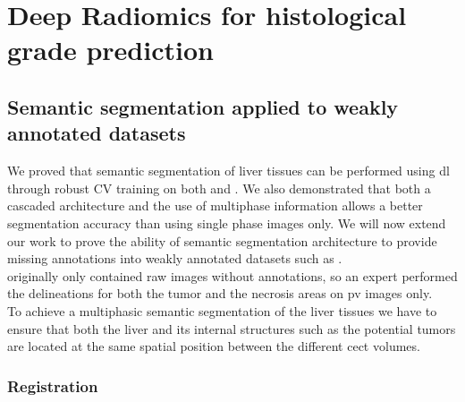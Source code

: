 \chapter{Deep Radiomics for histological grade prediction}

\section{Semantic segmentation applied to weakly annotated datasets}

We proved that semantic segmentation of liver tissues can be
performed using \ac{dl} through robust CV training on both \textbf{} and
\textbf{}.
We also demonstrated that both a cascaded architecture and the use of
multiphase information allows a better segmentation accuracy than using
single phase images only.
We will now extend our work to prove the ability of semantic segmentation architecture to provide missing annotations into weakly annotated datasets such as \textbf{}.\\
\textbf{} originally only
contained raw images without annotations, so an expert performed the
delineations for both the tumor and the necrosis areas on \ac{pv} images only. \\
To achieve a multiphasic semantic segmentation of the liver tissues we
have to ensure that both the liver and its internal structures such as
the potential tumors are located at the same spatial position between
the different \ac{cect} volumes.


\subsection{Registration}\label{registration}


